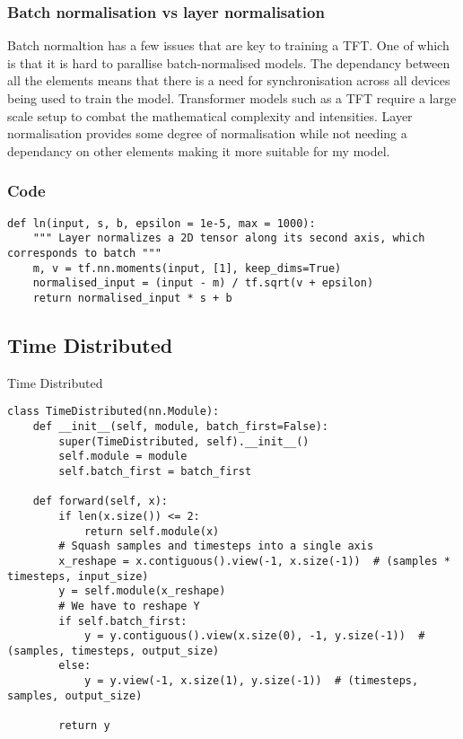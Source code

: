 \documentclass{article}
\begin{document}
\subsubsection{Batch normalisation vs layer normalisation}
Batch normaltion has a few issues that are key to training a TFT. One of which is that
it is hard to parallise batch-normalised models. The dependancy between all the elements
 means that there is a need for synchronisation across all devices being used to train the model. Transformer models such as a TFT require a large scale setup to combat the
 mathematical complexity and intensities. Layer normalisation provides some degree of
 normalisation while not needing a dependancy on other elements making it more suitable
 for my model.
\subsubsection{Code}
\begin{lstlisting}
def ln(input, s, b, epsilon = 1e-5, max = 1000):
    """ Layer normalizes a 2D tensor along its second axis, which corresponds to batch """
    m, v = tf.nn.moments(input, [1], keep_dims=True)
    normalised_input = (input - m) / tf.sqrt(v + epsilon)
    return normalised_input * s + b
\end{lstlisting}
\clearpage





\subsection{Time Distributed}
Time Distributed

\begin{lstlisting}
class TimeDistributed(nn.Module):
    def __init__(self, module, batch_first=False):
        super(TimeDistributed, self).__init__()
        self.module = module
        self.batch_first = batch_first

    def forward(self, x):
        if len(x.size()) <= 2:
            return self.module(x)
        # Squash samples and timesteps into a single axis
        x_reshape = x.contiguous().view(-1, x.size(-1))  # (samples * timesteps, input_size)
        y = self.module(x_reshape)
        # We have to reshape Y
        if self.batch_first:
            y = y.contiguous().view(x.size(0), -1, y.size(-1))  # (samples, timesteps, output_size)
        else:
            y = y.view(-1, x.size(1), y.size(-1))  # (timesteps, samples, output_size)

        return y
\end{lstlisting}
\end{document}
